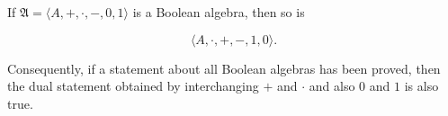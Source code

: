 If $\mathfrak{A} = \langle A, +, \cdot, -, 0, 1 \rangle$ is a Boolean algebra, then so is

$$\langle A, \cdot, +, -, 1, 0 \rangle.$$

Consequently, if a statement about all Boolean algebras has been proved, then the dual statement obtained by interchanging $+$ and $\cdot$ and also $0$ and $1$ is also true.
